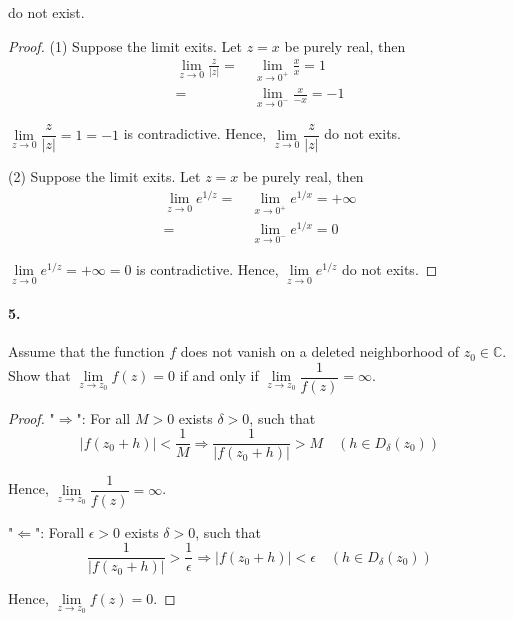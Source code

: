 \documentclass[12pt, a4paper, oneside]{article}
\begin{document}
do not exist.
\begin{proof}
    (1) Suppose the limit exits. Let $z = x$ be purely real, then
    \begin{equation*}
        \begin{aligned}
            \lim_{z\rightarrow 0} \frac{z}{|z|} =& \ \lim_{x\rightarrow 0^+}\frac{x}{x} = 1\\
            =&\ \lim_{x\rightarrow 0^-}\frac{x}{-x} = -1
        \end{aligned}
    \end{equation*}

    $\lim\limits_{z\rightarrow 0} \dfrac{z}{|z|} =1=-1$ is contradictive. Hence, $\lim\limits_{z\rightarrow 0}\dfrac{z}{|z|}$ do not exits.

    (2) Suppose the limit exits. Let $z = x$ be purely real, then
    \begin{equation*}
        \begin{aligned}
            \lim_{z\rightarrow 0}e^{1/z} =&\ \lim_{x\rightarrow 0^+} e^{1/x} = +\infty\\
            =&\ \lim_{x\rightarrow 0^-}e^{1/x} = 0
        \end{aligned}
    \end{equation*}

    $\lim\limits_{z\rightarrow 0}e^{1/z} = +\infty = 0$ is contradictive. Hence, $\lim\limits_{z\rightarrow 0}e^{1/z}$ do not exits.
\end{proof}
\paragraph{5.}Assume that the function $f$ does not vanish on a deleted neighborhood of $z_0\in \mathbb{C}$. Show that $\lim\limits_{z\rightarrow z_0}f(z)=0$ if and only if $\lim\limits_{z\rightarrow z_0}\dfrac{1}{f(z)} = \infty$.
\begin{proof}
    "$\Rightarrow$": For all $M > 0$ exists $\delta > 0$, such that
    \begin{equation*}
        |f(z_0+h)| < \frac{1}{M}\Rightarrow \frac{1}{|f(z_0+h)|} > M\quad (h\in D_{\delta}(z_0))
    \end{equation*}

    Hence, $\lim\limits_{z\rightarrow z_0}\dfrac{1}{f(z)} = \infty$.

    "$\Leftarrow$": Forall $\epsilon > 0$ exists $\delta > 0$, such that
    \begin{equation*}
        \frac{1}{|f(z_0+h)|} > \frac{1}{\epsilon}\Rightarrow|f(z_0+h)| < \epsilon\quad(h\in D_{\delta}(z_0))
    \end{equation*}

    Hence, $\lim\limits_{z\rightarrow z_0}f(z) = 0$.
\end{proof}
\end{document}
